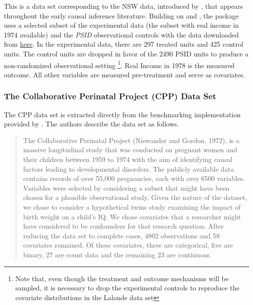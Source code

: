 \documentclass[../main.tex]{subfiles}
\begin{document}
This is a data set corresponding to the NSW data, introduced by \textcite{Lalonde1986EvaluatingData}, that appears throughout the early causal inference literature. Building on \textcite{Dehejia2005PracticalTodd} and \textcite{Smith2005DoesEstimators}, the package uses a selected subset of the \textcite{Lalonde1986EvaluatingData} experimental data (the subset with real income in 1974 available) and the \textit{PSID} observational controls with the data downloaded from \href{https://users.nber.org/~rdehejia/data/.nswdata2.html}{here}. In the experimental data, there are 297 treated units and 425 control units. The control units are dropped in favor of the 2490 PSID units to produce a non-randomized observational setting \footnote{Note that, even though the treatment and outcome mechanisms will be sampled, it is necessary to drop the experimental controls to reproduce the covariate distributions in the Lalonde data set}. Real Income in 1978 is the measured outcome. All other variables are measured pre-treatment and serve as covariates.

\subsubsection{The Collaborative Perinatal Project (CPP) Data Set}

The CPP data set is extracted directly from the benchmarking implementation provided by \textcite{Dorie2019Automated1}. The authors describe the data set as follows.

\begin{quote}
    The Collaborative Perinatal Project (Niswander and Gordon, 1972), is a massive longitudinal study that was conducted on pregnant women and their children between 1959 to 1974 with the aim of identifying causal factors leading to developmental disorders. The publicly available data contains records of over 55,000 pregnancies, each with over 6500 variables. Variables were selected by considering a subset that might have been chosen for a plausible observational study. Given the nature of the dataset, we chose to consider a hypothetical twins study examining the impact of birth weight on a child’s IQ. We chose covariates that a researcher might have considered to be confounders for that research question. After reducing the data set to complete cases, 4802 observations and 58 covariates remained. Of these covariates, three are categorical, five are binary, 27 are count data and the remaining 23 are continuous.
\end{quote}
\end{document}
